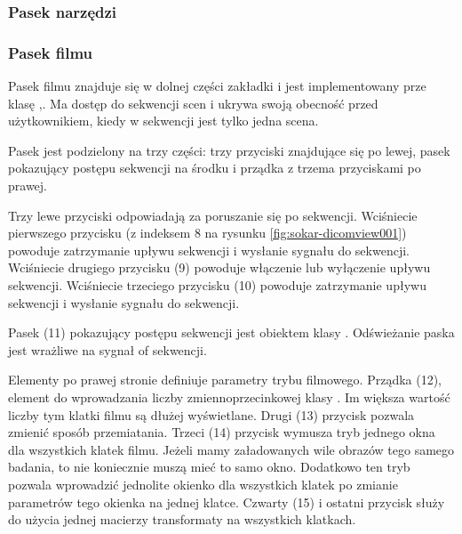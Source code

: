 \subsubsection{Pasek narzędzi}


\subsubsection{}
\label{sec:sokar-dicomgraphics}

\subsubsection{Pasek filmu}
\label{sec:sokar-moviebar}

\par
Pasek filmu znajduje się w dolnej części zakładki i jest implementowany prze klasę ,.
Ma dostęp do sekwencji scen i ukrywa swoją obecność przed użytkownikiem, kiedy w sekwencji jest tylko jedna scena.

\par
Pasek jest podzielony na trzy części: trzy przyciski znajdujące się po lewej, pasek pokazujący postępu sekwencji na środku i prządka z trzema przyciskami po prawej.

\par
Trzy lewe przyciski odpowiadają za poruszanie się po sekwencji.
Wciśniecie pierwszego przycisku (z indeksem 8 na rysunku \ref{fig:sokar-dicomview001}) powoduje zatrzymanie upływu sekwencji i wysłanie sygnału  do sekwencji.
Wciśniecie drugiego przycisku (9) powoduje włączenie lub wyłączenie upływu sekwencji.
Wciśniecie trzeciego przycisku (10) powoduje zatrzymanie upływu sekwencji i wysłanie sygnału  do sekwencji.
\par
Pasek (11) pokazujący postępu sekwencji jest obiektem klasy .
Odświeżanie paska jest wrażliwe na sygnał  of sekwencji.
\par
Elementy po prawej stronie definiuje parametry trybu filmowego.
Prządka (12), element do wprowadzania liczby zmiennoprzecinkowej klasy .
Im większa wartość liczby tym klatki filmu są dłużej wyświetlane.
Drugi (13) przycisk pozwala zmienić sposób przemiatania.
Trzeci (14) przycisk wymusza tryb jednego okna dla wszystkich klatek filmu.
Jeżeli mamy załadowanych wile obrazów tego samego badania, to nie koniecznie muszą mieć to samo okno.
Dodatkowo ten tryb pozwala wprowadzić jednolite okienko dla wszystkich klatek po zmianie parametrów tego okienka na jednej klatce.
Czwarty (15) i ostatni przycisk służy do użycia jednej macierzy transformaty na wszystkich klatkach.


